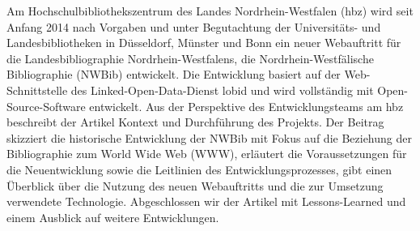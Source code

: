 Am Hochschulbibliothekszentrum des Landes Nordrhein-Westfalen (hbz) wird
seit Anfang 2014 nach Vorgaben und unter Begutachtung der Universitäts-
und Landesbibliotheken in Düsseldorf, Münster und Bonn ein neuer
Webauftritt für die Landesbibliographie Nordrhein-Westfalens, die
Nordrhein-Westfälische Bibliographie (NWBib) entwickelt. Die Entwicklung
basiert auf der Web- Schnittstelle des Linked-Open-Data-Dienst lobid und
wird vollständig mit Open- Source-Software entwickelt. Aus der
Perspektive des Entwicklungsteams am hbz beschreibt der Artikel Kontext
und Durchführung des Projekts. Der Beitrag skizziert die historische
Entwicklung der NWBib mit Fokus auf die Beziehung der Bibliographie zum
World Wide Web (WWW), erläutert die Voraussetzungen für die
Neuentwicklung sowie die Leitlinien des Entwicklungsprozesses, gibt
einen Überblick über die Nutzung des neuen Webauftritts und die zur
Umsetzung verwendete Technologie. Abgeschlossen wir der Artikel mit
Lessons-Learned und einem Ausblick auf weitere Entwicklungen.
